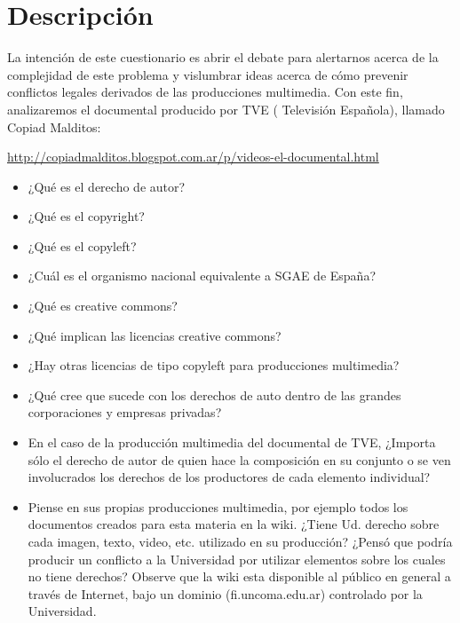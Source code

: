 \documentclass[12pt]{article}
\begin{document}
\section*{Descripción}
La intención de este cuestionario es abrir el debate para alertarnos 
acerca de la complejidad de este problema y vislumbrar ideas acerca de cómo 
prevenir conflictos legales derivados de las producciones multimedia. 
Con este fin, analizaremos el documental producido por TVE (
Televisión Española), llamado Copiad Malditos: 

\url{http://copiadmalditos.blogspot.com.ar/p/videos-el-documental.html}


\begin{itemize}
\item ¿Qué es el derecho de autor?

\item ¿Qué es el copyright?

\item ¿Qué es el copyleft?

\item ¿Cuál es el organismo nacional equivalente a SGAE de España?

\item ¿Qué es creative commons? 

\item ¿Qué implican las licencias creative commons?

\item ¿Hay otras licencias de tipo copyleft para producciones multimedia?

\item ¿Qué cree que sucede con los derechos de auto dentro de las grandes 
corporaciones y empresas privadas? 

\item En el caso de la producción multimedia del documental de TVE, ¿Importa sólo
el derecho de autor de quien hace la composición en su conjunto o se ven 
involucrados los derechos de los productores de cada elemento individual?

\item Piense en sus propias producciones multimedia, por ejemplo todos los 
documentos creados para esta materia en la wiki. ¿Tiene Ud. derecho sobre
cada imagen, texto, video, etc. utilizado en su producción? ¿Pensó que 
podría producir un conflicto a la Universidad por utilizar elementos sobre
los cuales no tiene derechos? Observe que la wiki esta disponible al público
en general a través de Internet, bajo un dominio (fi.uncoma.edu.ar) controlado
por la Universidad.
\end{itemize}
\end{document}
